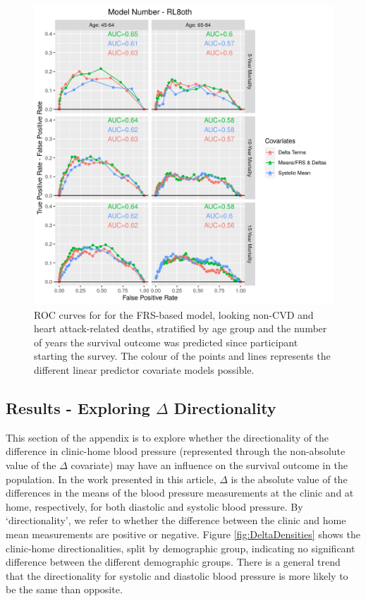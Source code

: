 \documentclass[
]{article}
\begin{document}
\begin{figure}
\hypertarget{fig:ROC_RL8oth}{%
\centering
\includegraphics{./Rmarkdown_Plots/ROC_CAx-Covariates_EventType_RL8oth.png}
\caption{ROC curves for for the FRS-based model, looking non-CVD and heart attack-related deaths, stratified by age group and the number of years the survival outcome was predicted since participant starting the survey. The colour of the points and lines represents the different linear predictor covariate models possible.}\label{fig:ROC_RL8oth}
}
\end{figure}

\hypertarget{results---exploring-delta-directionality}{%
\subsection{\texorpdfstring{Results - Exploring \(\Delta\) Directionality}{Results - Exploring \textbackslash Delta Directionality}}\label{results---exploring-delta-directionality}}

This section of the appendix is to explore whether the directionality of the difference in clinic-home blood pressure (represented through the non-absolute value of the \(\Delta\) covariate) may have an influence on the survival outcome in the population. In the work presented in this article, \(\Delta\) is the absolute value of the differences in the means of the blood pressure measurements at the clinic and at home, respectively, for both diastolic and systolic blood pressure. By `directionality', we refer to whether the difference between the clinic and home mean measurements are positive or negative. Figure \ref{fig:DeltaDensities} shows the clinic-home directionalities, split by demographic group, indicating no significant difference between the different demographic groups. There is a general trend that the directionality for systolic and diastolic blood pressure is more likely to be the same than opposite.
\end{document}
